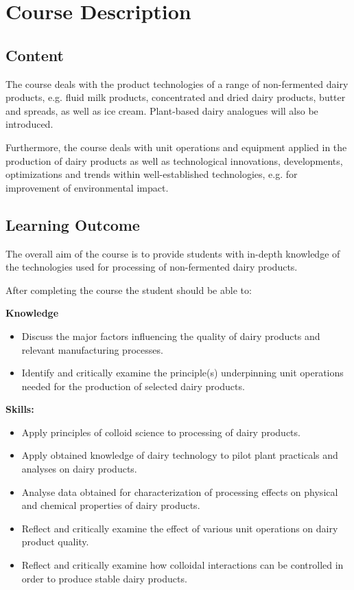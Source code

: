 \chapter*{Course Description}
\setlength{\headheight}{12.71342pt}
\addtolength{\topmargin}{-0.71342pt}

\section*{Content}
The course deals with the product technologies of a range of non-fermented dairy products, e.g. fluid milk products, concentrated and dried dairy products, butter and spreads, as well as ice cream. Plant-based dairy analogues will also be introduced.

Furthermore, the course deals with unit operations and equipment applied in the production of dairy products as well as technological innovations, developments, optimizations and trends within well-established technologies, e.g. for improvement of environmental impact. 

\section*{Learning Outcome}
The overall aim of the course is to provide students with in-depth knowledge of the technologies used for processing of non-fermented dairy products.

\vline

After completing the course the student should be able to:

\textbf{Knowledge}
\begin{itemize}
    \item Discuss the major factors influencing the quality of dairy products and relevant manufacturing processes.
    \item Identify and critically examine the principle(s) underpinning unit operations needed for the production of selected dairy products.
\end{itemize}
\vline

\textbf{Skills:}
\begin{itemize}
    \item Apply principles of colloid science to processing of dairy products.
    \item Apply obtained knowledge of dairy technology to pilot plant practicals and analyses on dairy products.
    \item Analyse data obtained for characterization of processing effects on physical and chemical properties of dairy products.
    \item Reflect and critically examine the effect of various unit operations on dairy product quality.
    \item Reflect and critically examine how colloidal interactions can be controlled in order to produce stable dairy products.
\end{itemize}
\vline

